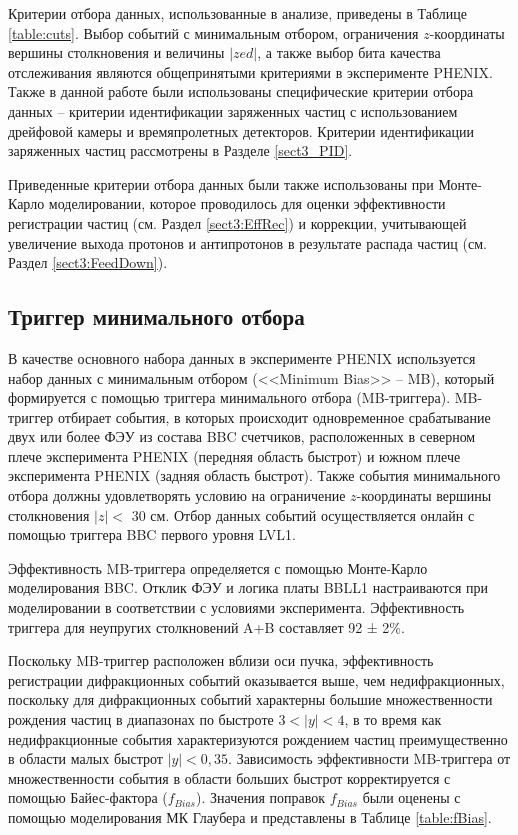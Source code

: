 Критерии отбора данных, использованные в анализе, приведены в Таблице \ref{table:cuts}. Выбор событий с минимальным отбором, ограничения $z$-координаты вершины столкновения и величины $|zed|$, а также выбор бита качества отслеживания являются общепринятыми критериями в эксперименте PHENIX. Также в данной работе были использованы специфические критерии отбора данных -- критерии идентификации заряженных частиц с использованием дрейфовой камеры и времяпролетных детекторов. Критерии идентификации заряженных частиц рассмотрены в Разделе \ref{sect3_PID}.

Приведенные критерии отбора данных были также использованы при Монте-Карло моделировании, которое проводилось для оценки эффективности регистрации частиц (см. Раздел \ref{sect3:EffRec}) и коррекции, учитывающей увеличение выхода протонов и антипротонов в результате распада частиц (см. Раздел \ref{sect3:FeedDown}). 

\subsection{Триггер минимального отбора}
В качестве основного набора данных в эксперименте PHENIX используется набор данных с минимальным отбором (<<Minimum Bias>> -- MB), который формируется с помощью триггера минимального отбора (MB-триггера).
MB-триггер отбирает события, в которых происходит одновременное срабатывание двух или более ФЭУ из состава BBC счетчиков, расположенных в северном плече эксперимента PHENIX (передняя область быстрот) и южном плече эксперимента PHENIX (задняя область быстрот).
Также события минимального отбора должны удовлетворять условию на ограничение $z$-координаты вершины столкновения $|z| < $ 30 см. Отбор данных событий осуществляется онлайн с помощью триггера BBC первого уровня LVL1.

Эффективность MB-триггера определяется с помощью Монте-Карло моделирования BBC. Отклик ФЭУ и логика платы BBLL1 настраиваются при моделировании в соответствии с условиями эксперимента. Эффективность триггера для неупругих столкновений A+B составляет 92 ± 2\%. 

Поскольку MB-триггер расположен вблизи оси пучка, эффективность регистрации дифракционных событий оказывается выше, чем недифракционных, поскольку для дифракционных событий характерны большие множественности рождения частиц в диапазонах по быстроте $3 <|y|<4$, в то время как недифракционные события характеризуются рождением частиц преимущественно в области малых быстрот $|y|<0,35$. Зависимость эффективности MB-триггера от множественности события в области больших быстрот корректируется с помощью Байес-фактора ($f_{Bias}$). 
Значения поправок $f_{Bias}$ были оценены с помощью моделирования МК Глаубера и представлены в Таблице \ref{table:fBias}.

